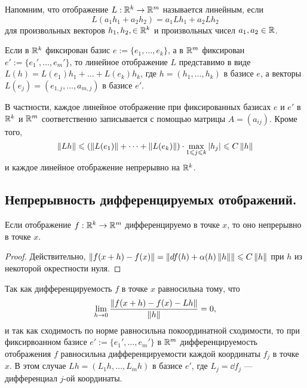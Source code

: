 \documentclass[a4paper]{article}
\theoremstyle{named}
\begin{document}
    \begin{remark*}
        Напомним, что отображение $L: \mathbb{R}^k \to \mathbb{R}^m$ называется линейным, если
        \begin{equation*}
            L(a_1h_1 + a_2h_2) = a_1Lh_1 + a_2Lh_2
        \end{equation*}
        для произвольных векторов $h_1, h_2, \in \mathbb{R}^k$ и произвольных чисел $a_1, a_2 \in \mathbb{R}$. 
        
        Если в $\mathbb{R}^k$ фиксирован базис $e := \{e_1, \dots, e_k\}$, а в $\mathbb{R}^m$ фиксирован $e' := \{e_1', \dots, e_m'\}$, то линейное отображение $L$ представимо в виде $L(h) = L(e_1)h_1 + \dots + L(e_k)h_k$, где $h = (h_1, \dots, h_k)$ в базисе $e$, а векторы $L(e_j) = (e_{1,j}, \dots, a_{m, j})$ в базисе $e'$. 

        В частности, каждое линейное отображение при фиксированных базисах $e$ и $e'$ в $\mathbb{R}^k$ и $\mathbb{R}^m$ соответственно записывается с помощью матрицы $A = (a_{ij})$. Кроме того,
        \begin{equation*}
            \left\lVert Lh\right\rVert \leqslant (\left\lVert L(e_1)\right\rVert + \dots + \left\lVert L(e_k)\right\rVert) \cdot \max\limits_{1 \leqslant j \leqslant k} |h_j| \leqslant C \left\lVert h\right\rVert
        \end{equation*}
        и каждое линейное отображение непрерывно на $\mathbb{R}^k$.
    \end{remark*}

    \subsection{Непрерывность дифференцируемых отображений.}

    \begin{consequence*}
        Если отображение $f: \mathbb{R}^k \to \mathbb{R}^m$ дифференцируемо в точке $x$, то оно непрерывно в точке $x$.
    \end{consequence*}

    \begin{proof}
        Действительно, $\left\lVert f(x + h) - f(x)\right\rVert = \left\lVert\mathop{}\!d f(h) + \alpha(h)\left\lVert h\right\rVert\right\rVert \leqslant C\left\lVert h\right\rVert$ при $h$ из некоторой окрестности нуля.
    \end{proof}

    \begin{remark*}
        Так как дифференцируемость $f$ в точке $x$ равносильна тому, что
        \begin{equation*}
            \lim_{h \to 0} \dfrac{\left\lVert f(x + h) - f(x) - Lh\right\rVert}{\left\lVert h\right\rVert} = 0,
        \end{equation*}
        и так как сходимость по норме равносильна покоординатной сходимости, то при фиксирвоанном базисе $e' := \{e_1', \dots, e_m'\}$ в $\mathbb{R}^m$ дифференцируемость отображения $f$ равносильна дифференцируемости каждой координаты $f_j$ в точке $x$. В этом случае $Lh = (L_1h, \dots, L_mh)$ в базисе $e'$, где $L_j = \dd f_j$ --- дифференциал $j$-ой координаты.
    \end{remark*}
\end{document}
